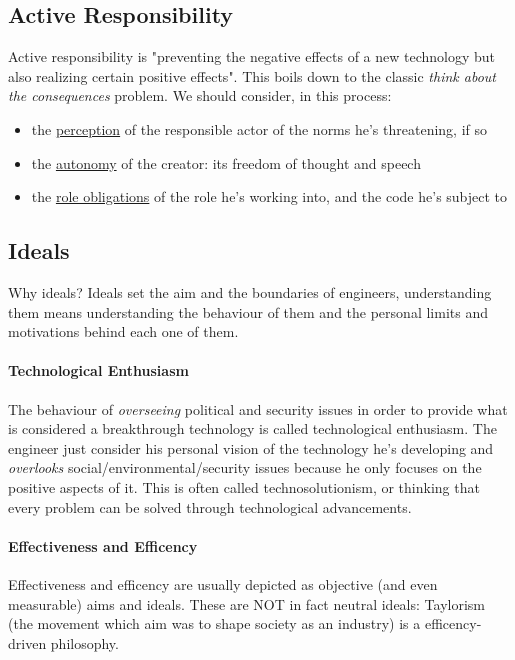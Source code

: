 \documentclass{article}
\begin{document}
		\subsection{Active Responsibility}
			Active responsibility is "preventing the negative effects of a new technology but also realizing certain positive effects". This boils down to the classic \textit{think about the consequences} problem. We should consider, in this process:
			\begin{itemize}
				\item the \underline{perception} of the responsible actor of the norms he's threatening, if so
				\item the \underline{autonomy} of the creator: its freedom of thought and speech
				\item the \underline{role obligations} of the role he's working into, and the code he's subject to
			\end{itemize}

		\subsection{Ideals}
			Why ideals? Ideals set the aim and the boundaries of engineers, understanding them means understanding the behaviour of them and the personal limits and motivations behind each one of them.

			\paragraph{Technological Enthusiasm}
				The behaviour of \textit{overseeing} political and security issues in order to provide what is considered a breakthrough technology is called technological enthusiasm. The engineer just consider his personal vision of the technology he's developing and \textit{overlooks} social/environmental/security issues because he only focuses on the positive aspects of it. This is often called technosolutionism, or thinking that every problem can be solved through technological advancements.

			\paragraph{Effectiveness and Efficency}
				Effectiveness and efficency are usually depicted as objective (and even measurable) aims and ideals. These are NOT in fact neutral ideals: Taylorism (the movement which aim was to shape society as an industry) is a efficency-driven philosophy.
			
\end{document}
